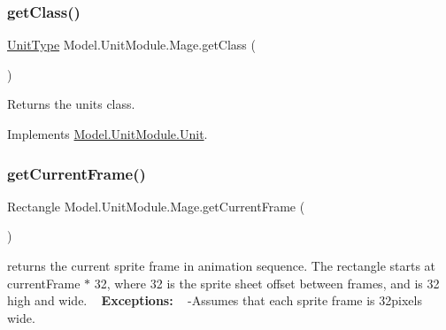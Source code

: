 \hypertarget{class_model_1_1_unit_module_1_1_mage_a1fa4709e8927042bfd858a330d8cba22}{}\label{class_model_1_1_unit_module_1_1_mage_a1fa4709e8927042bfd858a330d8cba22} 
\subsubsection{\texorpdfstring{get\+Class()}{getClass()}}
{\footnotesize\ttfamily \hyperlink{namespace_model_1_1_unit_module_aba9769f408747bf38d0d8adca8f68c98}{Unit\+Type} Model.\+Unit\+Module.\+Mage.\+get\+Class (\begin{DoxyParamCaption}{ }\end{DoxyParamCaption})\hspace{0.3cm}{\ttfamily [inline]}}

Returns the unit\textquotesingle{}s class. 

Implements \hyperlink{interface_model_1_1_unit_module_1_1_unit_a84dbb2982a68ec530e53662d747da9fa}{Model.\+Unit\+Module.\+Unit}.

\hypertarget{class_model_1_1_unit_module_1_1_mage_a66ef058e38d7220bc65604504eb25bce}{}\label{class_model_1_1_unit_module_1_1_mage_a66ef058e38d7220bc65604504eb25bce} 
\subsubsection{\texorpdfstring{get\+Current\+Frame()}{getCurrentFrame()}}
{\footnotesize\ttfamily Rectangle Model.\+Unit\+Module.\+Mage.\+get\+Current\+Frame (\begin{DoxyParamCaption}{ }\end{DoxyParamCaption})\hspace{0.3cm}{\ttfamily [inline]}}

returns the current sprite frame in animation sequence. The rectangle starts at current\+Frame $\ast$ 32, where 32 is the sprite sheet offset between frames, and is 32 high and wide. ~\newline
 {\bfseries Exceptions\+:} ~\newline
 -\/\+Assumes that each sprite frame is 32pixels wide. 


